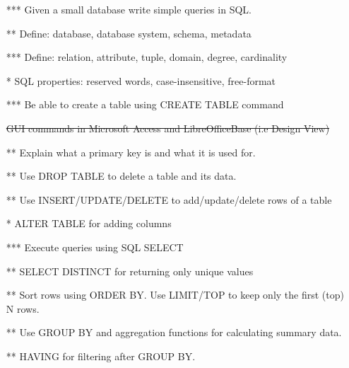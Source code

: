 \documentclass{article}%
\begin{document}
\begin{itemize}
\item[***] Given a small database write simple queries in SQL.
 \item[**] Define: database, database system, schema, metadata
\item[***] Define: relation, attribute, tuple, domain, degree, cardinality
\item[*] SQL properties: reserved words, case-insensitive, free-format
\item[***] Be able to create a table using CREATE TABLE command %
\item[] \sout{GUI commands in Microsoft Access and LibreOfficeBase (i.e Design View)}
\item[**] Explain what a primary key is and what it is used for.
\item[**]  Use DROP TABLE to delete a table and its data.
 \item[**] Use INSERT/UPDATE/DELETE to add/update/delete rows of a table %
 \item[*] ALTER TABLE for adding columns
\item[***] Execute queries using SQL SELECT %
  \item[**] SELECT DISTINCT for returning only unique values
 \item[**]Sort rows using ORDER BY. Use LIMIT/TOP to keep only the first (top) N rows.
 \item[**] Use GROUP BY and aggregation functions for calculating summary data.
  \item[**] HAVING for filtering after GROUP BY.
\end{itemize}
\end{document}
